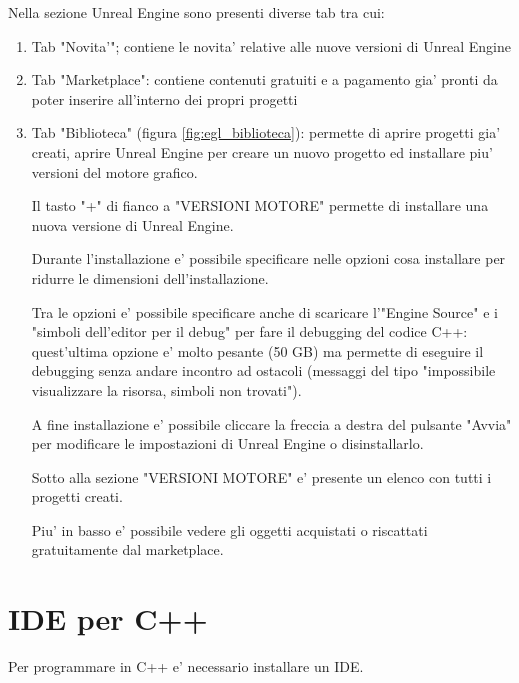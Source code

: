         Nella sezione Unreal Engine sono presenti diverse tab tra cui:
        \begin{enumerate}
            \item Tab "Novita'"; contiene le novita' relative alle nuove versioni di Unreal Engine
            \item Tab "Marketplace": contiene contenuti gratuiti e a pagamento gia' pronti da poter inserire all'interno dei propri progetti
            \item Tab "Biblioteca" (figura \ref{fig:egl_biblioteca}): permette di aprire progetti gia' creati, aprire Unreal Engine per creare un nuovo progetto ed installare piu' versioni del motore grafico.

                Il tasto "+" di fianco a "VERSIONI MOTORE" permette di installare una nuova versione di Unreal Engine.

                Durante l'installazione e' possibile specificare nelle opzioni cosa installare per ridurre le dimensioni dell'installazione.

                \begin{suggestionbox}
                    Tra le opzioni e' possibile specificare anche di scaricare l'"Engine Source" e i "simboli dell'editor per il debug" per fare il debugging del codice C++:
                    quest'ultima opzione e' molto pesante (50 GB) ma permette di eseguire il debugging senza andare incontro ad ostacoli
                    (messaggi del tipo "impossibile visualizzare la risorsa, simboli non trovati").
                \end{suggestionbox}

                A fine installazione e' possibile cliccare la freccia a destra del pulsante "Avvia" per modificare le impostazioni di Unreal Engine o disinstallarlo.

                Sotto alla sezione "VERSIONI MOTORE" e' presente un elenco con tutti i progetti creati.

                Piu' in basso e' possibile vedere gli oggetti acquistati o riscattati gratuitamente dal marketplace.

        \end{enumerate}


    \section{IDE per C++}

        Per programmare in C++ e' necessario installare un IDE.

